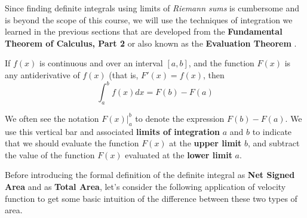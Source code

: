 \noindent Since finding definite integrals using limits of \emph{Riemann sums} is cumbersome and is beyond the scope of this course, we will use the techniques of integration we learned in the previous sections that are developed from the \textbf{Fundamental Theorem of Calculus, Part 2 } or also known as the \textbf{Evaluation Theorem} .

\begin{tcolorbox}[title = {Review: Calculating Definite Integral using The Evaluation Theorem}]
\noindent If $f(x)$ is continuous and  over an interval $[a,b]$, and the function $F(x)$ is any antiderivative of $f(x)$ (that is, $F'(x)=f(x)$, then 
\begin{equation}\label{eq:evaluationTheorem}
\int_{a}^{b} f(x) dx = F(b)-F(a)    
\end{equation}

\noindent We often see the notation $F(x)\big|_{a}^{b}$ to denote the expression $F(b)-F(a)$. We use this vertical bar and associated \textbf{limits of integration} $a$ and $b$ to indicate that we should evaluate the function $F(x)$ at the \textbf{upper limit} $b$, and subtract the value of the function $F(x)$ evaluated at the \textbf{lower limit} $a$.\\

\end{tcolorbox}

\noindent Before introducing the formal definition of the definite integral as \textbf{Net Signed Area} and as \textbf{Total Area}, let's consider the following application of velocity function to get some basic intuition of the difference between these two types of area. \\

